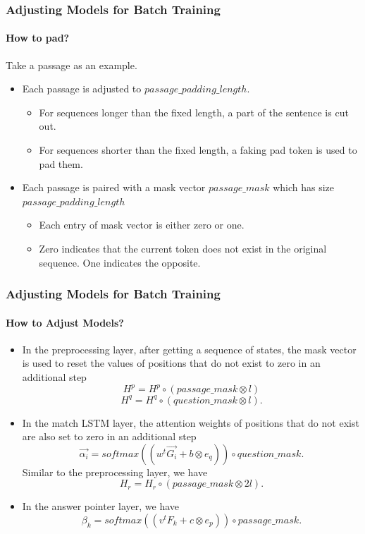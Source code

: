\documentclass{beamer}
\begin{document}
\begin{frame}\frametitle{Adjusting Models for Batch Training}\framesubtitle{How to pad?}
Take a passage as an example.
    \begin{itemize}
        \item Each passage is adjusted to $passage\_padding\_length$.
            \begin{itemize}
                \item For sequences longer than the fixed length, a part of the sentence is cut out.
                \item For sequences shorter than the fixed length, a faking pad token is used to pad them.
            \end{itemize}
        \item Each passage is paired with a mask vector $passage\_mask$ which has size $passage\_padding\_length$
            \begin{itemize}
                \item Each entry of mask vector is either zero or one. \item Zero indicates that the current token does not exist in the original sequence. One indicates the opposite.
            \end{itemize}
    \end{itemize}
\end{frame}

\begin{frame}\frametitle{Adjusting Models for Batch Training}\framesubtitle{How to Adjust Models?}
    \begin{itemize}
        \item In the preprocessing layer, after getting a sequence of states, the mask vector is used to reset the values of positions that do not exist to zero in an additional step
        $$H^p = H^p \circ (passage\_mask \otimes l)$$
        $$H^q = H^q \circ (question\_mask \otimes l).$$
        \item In the match LSTM layer, the attention weights of positions that do not exist are also set to zero in an additional step
        $$\overrightarrow{\alpha _i} = softmax( (w^t\overrightarrow{G_i} + b \otimes e_q) ) \circ question\_mask .$$
        Similar to the preprocessing layer, we have
        $$H_r = H_r \circ (passage\_mask \otimes 2l).$$
        \item In the answer pointer layer, we have
        $$\beta _k = softmax( (v^tF_k + c \otimes e_p) ) \circ passage\_mask.$$
    \end{itemize}
\end{frame}
\end{document}
